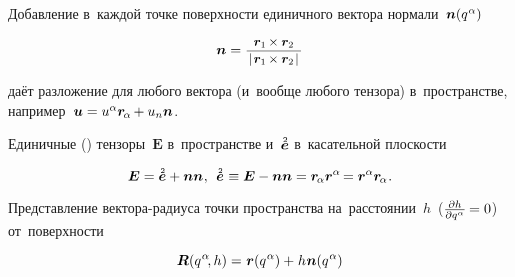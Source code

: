 \begin{otherlanguage}{russian}
Добавление в~каждой точке поверхности единичного вектора нормали~${\bm{n}(q^{\hspace{.1ex}\alpha})}$

\nopagebreak\vspace{-1em}\begin{equation*}
\bm{n} = \scalebox{.92}{$
\displaystyle \frac{\bm{r}_1 \hspace{-0.15ex} \times \bm{r}_2}%
{\hspace{.4ex} | \hspace{.2ex} \bm{r}_1 \hspace{-0.15ex} \times \bm{r}_2 \hspace{.2ex} | \hspace{.4ex}}
$}
\end{equation*}

\vspace{-0.1em} \noindent даёт разложение для любого вектора (и~вообще любого тензора) в~пространстве, например~${\bm{u} = u^\alpha \bm{r}_{\hspace{-0.2ex}\alpha} \hspace{-0.15ex} + u_n \bm{n}}$.

Единичные () тензоры~$\bm{E}$ в~пространстве и~$\mathtwoabove{\bm{e}}$ в~касательной плоскости

\nopagebreak\vspace{-0.25em}\begin{equation*}
\bm{E} = \mathtwoabove{\bm{e}} + \bm{n} \bm{n}
\hspace{.1ex} , \:\:
\mathtwoabove{\bm{e}} \hspace{.1ex} \equiv \bm{E} - \bm{n} \bm{n} = \bm{r}_{\hspace{-0.2ex}\alpha} \bm{r}^\alpha \hspace{-0.25ex} = \bm{r}^\alpha \bm{r}_{\hspace{-0.2ex}\alpha}
\hspace{.1ex} .
\vspace{-0.2em}
\end{equation*}

Представление вектора\hbox{-}радиуса точки пространства на~рас\-стоя\-нии~$h$~(${\frac{\partial h}{\partial q^{\alpha}} \hspace{-0.2ex} = 0}$) от~поверхности

\nopagebreak\vspace{-0.2em}\begin{equation*}
\bm{R}(q^{\hspace{.1ex}\alpha} \hspace{-0.4ex}, h) = \hspace{.1ex} \bm{r}(q^{\hspace{.1ex}\alpha}) + \hspace{.1ex} h \hspace{.1ex} \bm{n}(q^{\hspace{.1ex}\alpha})
\end{equation*}


\end{otherlanguage}
